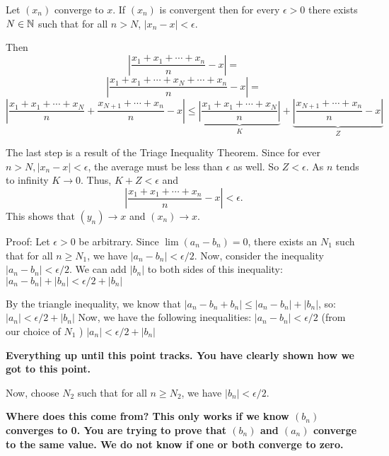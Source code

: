 \documentclass{report}
\begin{document}
\bigskip
\begin{myproof}
    
  Let $(x_n)$ converge to $x$. If $(x_n)$ is convergent then for every $\epsilon >0$ there exists $N \in \NN$ such that for all $n > N$, $| x_{n} - x| < \epsilon.$

  Then $$ \left| \frac{x_1 + x_1 +\cdots + x_{n} }{n}  - x\right|= $$$$ \left| \frac{x_1 + x_1 + \cdots + x_{N}+ \cdots + x_{n} }{n}  - x\right|= $$
$$ \left| \frac{x_1 + x_1 + \cdots + x_{N}}{n} + \frac{ x_{N+1}+ \cdots + x_{n} }{n} - x\right| \leq \underbrace{\left| \frac{x_1 + x_1 + \cdots + x_{N}}{n} \right|}_{K}+ \underbrace{ \left|\frac{ x_{N + 1}+ \cdots + x_{n} }{n} - x\right|}_{Z}$$

The last step is a result of the Triage Inequality Theorem. Since for ever $n > N, | x_{n} - x| < \epsilon$, the average must be less than $\epsilon$ as well. So $Z < \epsilon.$ As $n$ tends to infinity $K \rightarrow 0.$  Thus, $ K + Z <\epsilon$ and
$$ \left| \frac{x_1 + x_1 +\cdots + x_{n} }{n}  - x\right|< \epsilon.$$
This shows that $(y_n) \rightarrow x$ and $(x_n) \rightarrow x.$

\bigskip
\end{myproof}



Proof:
Let $\epsilon>0$ be arbitrary. Since $\lim \left(a_n-b_n\right)=0$, there exists an $N_1$ such that for all $n \geq N_1$, we have $\left|a_n-b_n\right|<\epsilon / 2$. Now, consider the inequality $\left|a_n-b_n\right|<\epsilon / 2$. We can add $\left|b_n\right|$ to both sides of this inequality: $\left|a_n-b_n\right|+\left|b_n\right|<\epsilon / 2+\left|b_n\right|$

By the triangle inequality, we know that $\left|a_n-b_n+b_n\right| \leq\left|a_n-b_n\right|+\left|b_n\right|$, so: $\left|a_n\right|<\epsilon / 2+\left|b_n\right|$ Now, we have the following inequalities: $\left|a_n-b_n\right|<\epsilon / 2$ (from our choice of $N_1$ )
$\left|a_n\right|<\epsilon / 2+\left|b_n\right|$
\par
\textbf{Everything up until this point tracks. You have clearly shown how we got to this point.}
\par
Now, choose $N_2$ such that for all $n \geq N_2$, we have $\left|b_n\right|<\epsilon / 2$. 
\par
\textbf{Where does this come from? This only works if we know $(b_n)$ converges to 0. You are trying to prove that $(b_n)$ and $(a_n)$ converge to the same value. We do not know if one or both converge to zero.}
\end{document}
